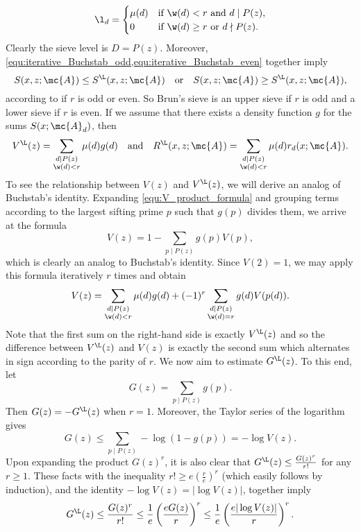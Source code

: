     \[
      \l_{d} = \begin{cases} \mu(d) & \text{if $\w(d) < r$ and $d \mid P(z)$}, \\ 0 & \text{if $\w(d) \ge r$ or $d \nmid P(z)$}. \end{cases}
    \]
    Clearly the sieve level is $D = P(z)$. Moreover, \cref{equ:iterative_Buchstab_odd,equ:iterative_Buchstab_even} together imply
    \[
      S(x,z;\mc{A}) \le S^{\L}(x,z;\mc{A}) \quad \text{or} \quad S(x,z;\mc{A}) \ge S^{\L}(x,z;\mc{A}),
    \]
    according to if $r$ is odd or even. So Brun's sieve is an upper sieve if $r$ is odd and a lower sieve if $r$ is even. If we assume that there exists a density function $g$ for the sums $S(x;\mc{A}_{d})$, then
    \[
      V^{\L}(z) = \sum_{\substack{d \mid P(z) \\ \w(d) < r}}\mu(d)g(d) \quad \text{and} \quad R^{\L}(x,z;\mc{A}) = \sum_{\substack{d \mid P(z) \\ \w(d) < r}}\mu(d)r_{d}(x;\mc{A}).
    \]
    To see the relationship between $V(z)$ and $V^{\L}(z)$, we will derive an analog of Buchstab's identity. Expanding \cref{equ:V_product_formula} and grouping terms according to the largest sifting prime $p$ such that $g(p)$ divides them, we arrive at the formula
    \[
      V(z) = 1-\sum_{p \mid P(z)}g(p)V(p),
    \]
    which is clearly an analog to Buchstab's identity. Since $V(2) = 1$, we may apply this formula iteratively $r$ times and obtain
    \[
      V(z) = \sum_{\substack{d \mid P(z) \\ \w(d) < r}}\mu(d)g(d)+(-1)^{r}\sum_{\substack{d \mid P(z) \\ \w(d) = r}}g(d)V(p(d)).
    \]
    Note that the first sum on the right-hand side is exactly $V^{\L}(z)$ and so the difference between $V^{\L}(z)$ and $V(z)$ is exactly the second sum which alternates in sign according to the parity of $r$. We now aim to estimate $G^{\L}(z)$. To this end, let
    \[
      G(z) = \sum_{p \mid P(z)}g(p).
    \]
    Then $G(z) = -G^{\L}(z)$ when $r = 1$. Moreover, the Taylor series of the logarithm gives
    \[
      G(z) \le \sum_{p \mid P(z)}-\log(1-g(p)) = -\log V(z).
    \]
    Upon expanding the product $G(z)^{r}$, it is also clear that $G^{\L}(z) \le \frac{G(z)^{r}}{r!}$ for any $r \ge 1$. These facts with the inequality $r! \ge e\left(\frac{r}{e}\right)^{r}$ (which easily follows by induction), and the identity $-\log V(z) = |\log V(z)|$, together imply
    \begin{equation}\label{equ:Bruns_sieve_G_bound_1}
      G^{\L}(z) \le \frac{G(z)^{r}}{r!} \le \frac{1}{e}\left(\frac{eG(z)}{r}\right)^{r} \le \frac{1}{e}\left(\frac{e|\log V(z)|}{r}\right)^{r}.
    \end{equation}
